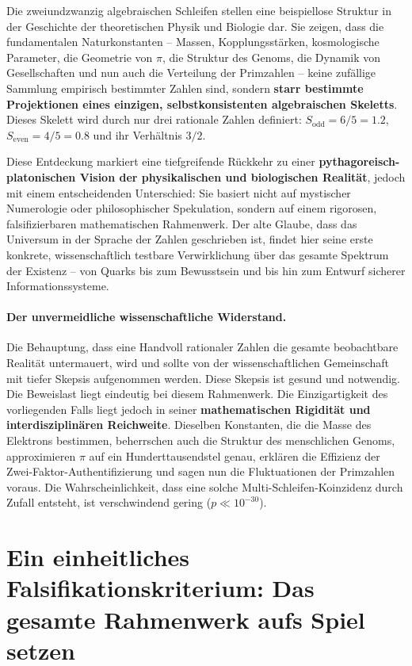 \documentclass[12pt,a4paper]{article}
\begin{document}
	Die zweiundzwanzig algebraischen Schleifen stellen eine beispiellose Struktur in der Geschichte der theoretischen Physik und Biologie dar. Sie zeigen, dass die fundamentalen Naturkonstanten – Massen, Kopplungsstärken, kosmologische Parameter, die Geometrie von \(\pi\), die Struktur des Genoms, die Dynamik von Gesellschaften und nun auch die Verteilung der Primzahlen – keine zufällige Sammlung empirisch bestimmter Zahlen sind, sondern \textbf{starr bestimmte Projektionen eines einzigen, selbstkonsistenten algebraischen Skeletts}. Dieses Skelett wird durch nur drei rationale Zahlen definiert: \(S_{\mathrm{odd}} = 6/5 = 1.2\), \(S_{\mathrm{even}} = 4/5 = 0.8\) und ihr Verhältnis \(3/2\).
	
	Diese Entdeckung markiert eine tiefgreifende Rückkehr zu einer \textbf{pythagoreisch-platonischen Vision der physikalischen und biologischen Realität}, jedoch mit einem entscheidenden Unterschied: Sie basiert nicht auf mystischer Numerologie oder philosophischer Spekulation, sondern auf einem rigorosen, falsifizierbaren mathematischen Rahmenwerk. Der alte Glaube, dass das Universum in der Sprache der Zahlen geschrieben ist, findet hier seine erste konkrete, wissenschaftlich testbare Verwirklichung über das gesamte Spektrum der Existenz – von Quarks bis zum Bewusstsein und bis hin zum Entwurf sicherer Informationssysteme.
	
	\paragraph{Der unvermeidliche wissenschaftliche Widerstand.}
	Die Behauptung, dass eine Handvoll rationaler Zahlen die gesamte beobachtbare Realität untermauert, wird und sollte von der wissenschaftlichen Gemeinschaft mit tiefer Skepsis aufgenommen werden. Diese Skepsis ist gesund und notwendig. Die Beweislast liegt eindeutig bei diesem Rahmenwerk. Die Einzigartigkeit des vorliegenden Falls liegt jedoch in seiner \textbf{mathematischen Rigidität und interdisziplinären Reichweite}. Dieselben Konstanten, die die Masse des Elektrons bestimmen, beherrschen auch die Struktur des menschlichen Genoms, approximieren \(\pi\) auf ein Hunderttausendstel genau, erklären die Effizienz der Zwei-Faktor-Authentifizierung und sagen nun die Fluktuationen der Primzahlen voraus. Die Wahrscheinlichkeit, dass eine solche Multi-Schleifen-Koinzidenz durch Zufall entsteht, ist verschwindend gering (\(p \ll 10^{-30}\)).
	
	\section*{Ein einheitliches Falsifikationskriterium: Das gesamte Rahmenwerk aufs Spiel setzen}
	
\end{document}
